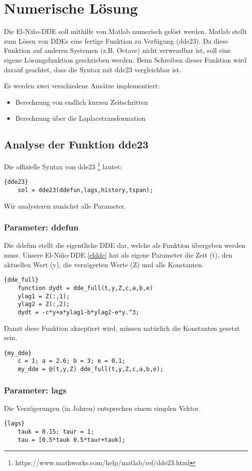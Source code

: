 \section{Numerische Lösung}

Die El-Niño-DDE soll mithilfe von Matlab numerisch gelöst werden.
Matlab stellt zum Lösen von DDEs eine fertige Funktion zu Verfügung (dde23).
Da diese Funktion auf anderen Systemen (z.B. Octave) nicht verwendbar ist, soll eine eigene Lösungsfunktion geschrieben werden.
Beim Schreiben dieser Funktion wird darauf geachtet, dass die Syntax mit dde23 vergleichbar ist. 

Es werden zwei verschiedene Ansätze implementiert: 
\begin{itemize}
	\item Berechnung von endlich kurzen Zeitschritten
	\item Berechnung über die Laplacetransformation
\end{itemize}

\subsection{Analyse der Funktion dde23}
Die offizielle Syntax von dde23 \footnote{https://www.mathworks.com/help/matlab/ref/dde23.html} lautet: 
\begin{lstlisting}{dde23}
	sol = dde23(ddefun,lags,history,tspan);
\end{lstlisting}
Wir analysieren zunächst alle Parameter.

\subsubsection{Parameter: ddefun}
Die ddefun stellt die eigentliche DDE dar, welche als Funktion übergeben werden muss.
Unsere El-Niño-DDE \ref{eldde} hat als eigene Parameter die Zeit (t), den aktuellen Wert (y), die verzögerten Werte (Z) und alle Konstanten.
\begin{lstlisting}{dde_full}
	function dydt = dde_full(t,y,Z,c,a,b,e)
	ylag1 = Z(:,1);
	ylag2 = Z(:,2);
	dydt = -c*y+a*ylag1-b*ylag2-e*y.^3;
\end{lstlisting}
Damit diese Funktion akzeptiert wird, müssen natürlich die Konstanten gesetzt sein.
\begin{lstlisting}{my_dde}
	c = 1; a = 2.6; b = 3; e = 0.1;
	my_dde = @(t,y,Z) dde_full(t,y,Z,c,a,b,e);
\end{lstlisting}

\subsubsection{Parameter: lags}
Die Verzögerungen (in Jahren) entsprechen einem simplen Vektor.
\begin{lstlisting}{lags}
	tauk = 0.15; taur = 1;
	tau = [0.5*tauk 0.5*taur+tauk];
\end{lstlisting}

